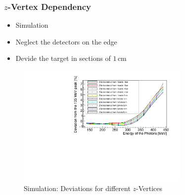 \documentclass[slidestop,compress,mathserif]{beamer}
\begin{document}
\begin{frame}
	\frametitle{$z$-Vertex Dependency}
	\begin{itemize}
		\item Simulation
		\item Neglect the detectors on the edge
		\item Devide the target in sections of $1\,\text{cm}$
	\end{itemize}


\begin{figure}
	\includegraphics[width=0.750\textwidth]{Pictures/20172804MCZVertexDeviation}
	\caption{Simulation: Deviations for different $z$-Vertices}
\end{figure}

\end{frame}
\end{document}
